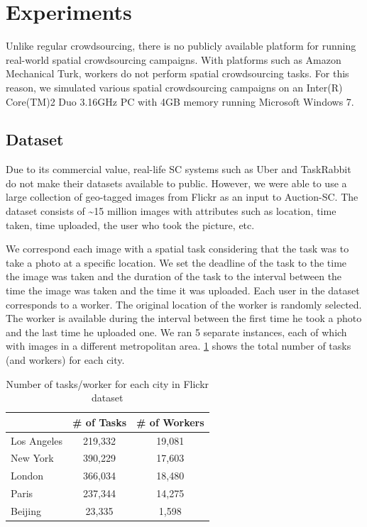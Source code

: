 \section{Experiments}
\label{sec:experiments}
Unlike regular crowdsourcing, there is no publicly available platform for running real-world spatial crowdsourcing campaigns. With platforms such as Amazon Mechanical Turk, workers do not perform spatial crowdsourcing tasks. For this reason, we simulated various spatial crowdsourcing campaigns on an Inter(R) Core(TM)2 Duo 3.16GHz PC with 4GB memory running Microsoft Windows 7.

\subsection{Dataset}
\label{subsec:dataset}
Due to its commercial value, real-life SC systems such as Uber and TaskRabbit do not make their datasets available to public. However, we were able to use a large collection of geo-tagged images from Flickr \cite{Thomee15} as an input to Auction-SC. The dataset consists of \textasciitilde 15 million images with attributes such as location, time taken, time uploaded, the user who took the picture, etc.

We correspond each image with a spatial task considering that the task was to take a photo at a specific location. We set the deadline of the task to the time the image was taken and the duration of the task to the interval between the time the image was taken and the time it was uploaded. Each user in the dataset corresponds to a worker. The original location of the worker is randomly selected. The worker is available during the interval between the first time he took a photo and the last time he uploaded one. We ran 5 separate instances, each of which with images in a different metropolitan area. \cref{tab:flickr_stats} shows the total number of tasks (and workers) for each city.

\begin{table}[h]
\begin{center}
\begin{tabular}{| l || c | c |} \hline
			&	\# of Tasks	&	\# of Workers	\\ \hline
Los Angeles	&	219,332		&		19,081		\\ \hline
New York	&	390,229		&		17,603		\\ \hline
London		& 	366,034		&		18,480		\\ \hline
Paris		&	237,344		&		14,275		\\ \hline
Beijing		&	23,335		&		1,598		\\ \hline
\end{tabular}
\vspace{-0.1in}
\caption{\small{Number of tasks/worker for each city in Flickr dataset}}
\label{tab:flickr_stats}
\end{center}
\end{table}

